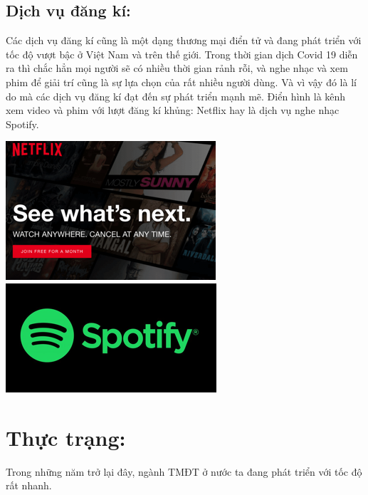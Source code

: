 \documentclass[13pt,a4paper]{article}
\begin{document}
    \subsection{Dịch vụ đăng kí:}
    Các dịch vụ đăng kí cũng là một dạng thương mại điển tử và đang phát triển với tốc độ vượt bậc ở Việt Nam và trên thế giới. Trong thời gian dịch Covid 19 diễn ra thì chắc hẳn mọi người sẽ có nhiều thời gian rảnh rỗi, và nghe nhạc và xem phim để giải trí cũng là sự lựa chọn của rất nhiều người dùng. Và vì vậy đó là lí do mà các dịch vụ đăng kí đạt đến sự phát triển mạnh mẽ. Điển hình là kênh xem video và phim với lượt đăng kí khủng: Netflix hay là dịch vụ nghe nhạc Spotify.
    \begin{center}
    \includegraphics[scale=0.89]{images/net.png} 
    \quad \includegraphics[scale=1.1]{images/spot.png} \\
    \end{center}
\fontsize{13pt}{1.2pt}\selectfont
\section{Thực trạng:}
Trong những năm trở lại đây, ngành TMĐT ở nước ta đang phát triển với tốc độ rất nhanh.
\end{document}
